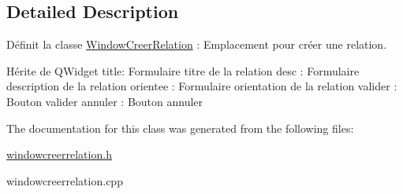 \subsection{Detailed Description}
Définit la classe \hyperlink{class_window_creer_relation}{Window\+Creer\+Relation} \+: Emplacement pour créer une relation. 

Hérite de Q\+Widget title\+: Formulaire titre de la relation desc \+: Formulaire description de la relation orientee \+: Formulaire orientation de la relation valider \+: Bouton valider annuler \+: Bouton annuler 

The documentation for this class was generated from the following files\+:\begin{DoxyCompactItemize}
\item 
\hyperlink{windowcreerrelation_8h}{windowcreerrelation.\+h}\item 
windowcreerrelation.\+cpp\end{DoxyCompactItemize}
